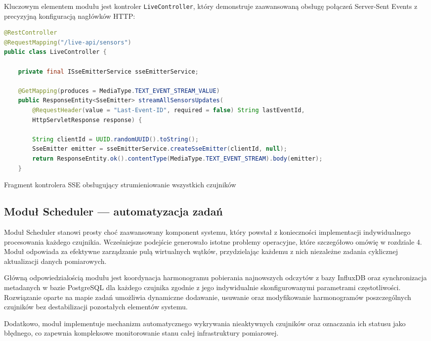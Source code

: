 \documentclass[a4paper,12pt,openany]{book}
\begin{document}
Kluczowym elementem modułu jest kontroler \texttt{LiveController}, który demonstruje zaawansowaną obsługę połączeń Server-Sent Events z precyzyjną konfiguracją nagłówków HTTP:

\begin{lstfloat}[H]
\begin{lstlisting}[language=java]
@RestController
@RequestMapping("/live-api/sensors")
public class LiveController {

    private final ISseEmitterService sseEmitterService;

    @GetMapping(produces = MediaType.TEXT_EVENT_STREAM_VALUE)
    public ResponseEntity<SseEmitter> streamAllSensorsUpdates(
        @RequestHeader(value = "Last-Event-ID", required = false) String lastEventId,
        HttpServletResponse response) {

        String clientId = UUID.randomUUID().toString();
        SseEmitter emitter = sseEmitterService.createSseEmitter(clientId, null);
        return ResponseEntity.ok().contentType(MediaType.TEXT_EVENT_STREAM).body(emitter);
    }
\end{lstlisting}
\caption{Fragment kontrolera SSE obsługujący strumieniowanie wszystkich czujników}
\label{lst:live-controller}
\end{lstfloat}


\subsection{Moduł Scheduler --- automatyzacja zadań}

Moduł Scheduler stanowi prosty choć zaawansowany komponent systemu, który powstał z konieczności implementacji indywidualnego procesowania każdego czujnikia. Wcześniejsze podejście generowało istotne problemy operacyjne, które szczegółowo omówię w rozdziale 4. Moduł odpowiada za efektywne zarządzanie pulą wirtualnych wątków, przydzielając każdemu z nich niezależne zadania cyklicznej aktualizacji danych pomiarowych.

Główną odpowiedzialością modułu jest koordynacja harmonogramu pobierania najnowszych odczytów z bazy InfluxDB oraz synchronizacja metadanych w bazie PostgreSQL dla każdego czujnika zgodnie z jego indywidualnie skonfigurowanymi parametrami częstotliwości. Rozwiązanie oparte na mapie zadań umożliwia dynamiczne dodawanie, usuwanie oraz modyfikowanie harmonogramów poszczególnych czujników bez destabilizacji pozostałych elementów systemu.

Dodatkowo, moduł implementuje mechanizm automatycznego wykrywania nieaktywnych czujników oraz oznaczania ich statusu jako błędnego, co zapewnia kompleksowe monitorowanie stanu całej infrastruktury pomiarowej.
\end{document}
